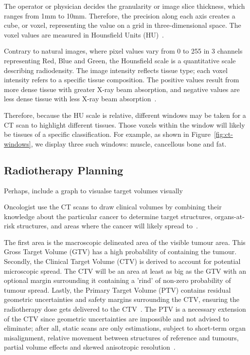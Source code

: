 \documentclass[12pt,twoside]{report}
\begin{document}
The operator or physician decides the granularity or image slice thickness, which ranges from 1mm to 10mm. Therefore, the precision along each axis creates a cube, or voxel, representing the value on a grid in three-dimensional space. The voxel values are measured in Hounsfield Units (HU)~\cite{diagnostic-radiology-physics}. 

Contrary to natural images, where pixel values vary from 0 to 255 in 3 channels representing Red, Blue and Green, the Hounsfield scale is a quantitative scale describing radiodensity. The image intensity reflects tissue type; each voxel intensity refers to a specific tissue composition. The positive values result from more dense tissue with greater X-ray beam absorption, and negative values are less dense tissue with less X-ray beam absorption~\cite{Statpearls}.  

Therefore, because the HU scale is relative, different windows may be taken for a CT scan to highlight different tissues. Those voxels within the window will likely be tissues of a specific classification. For example, as shown in Figure~\ref{fig:ct-windows}, we display three such windows: muscle, cancellous bone and fat.

\subsection{Radiotherapy Planning}\label{sect:radiotherapy-planning}

\begin{warning}
  Perhaps, include a graph to visualse target volumes visually
\end{warning}

Oncologist use the CT scans to draw clinical volumes by combining their knowledge about the particular cancer to determine target structures, organs-at-risk structures, and areas where the cancer will likely spread to~\cite{AMLART-data}. 

The first area is the macroscopic delineated area of the visible tumour area. This Gross Target Volume (GTV) has a high probability of containing the tumour. Secondly, the Clinical Target Volume (CTV) is derived to account for potential microscopic spread. The CTV will be an area at least as big as the GTV with an optional margin surrounding it containing a 'rind' of non-zero probability of tumour spread. Lastly, the Primary Target Volume (PTV) contains residual geometric uncertainties and safety margins surrounding the CTV, ensuring the radiotherapy dose gets delivered to the CTV~\cite{tumor-delineation,defining-target-volumes,Lin2021-oz,personalised-PTV-strategies}. The PTV is a necessary extension of the CTV since geometric uncertainties are impossible and not advised to eliminate; after all, static scans are only estimations, subject to short-term organ misalignment, relative movement between structures of reference and tumours, partial volume effects and skewed anisotropic resolution~\cite{VANHERK200452}.
\end{document}

